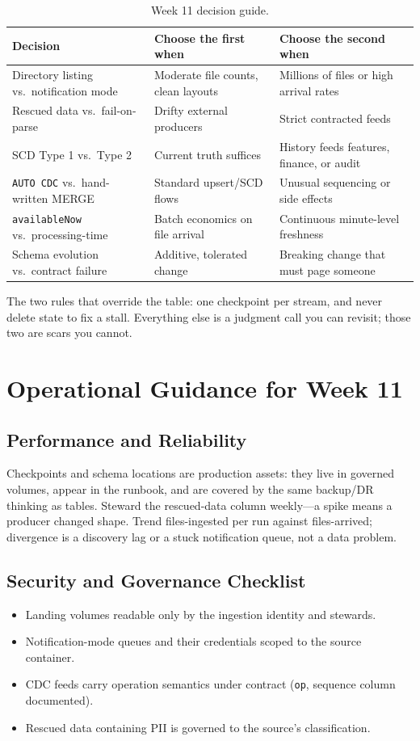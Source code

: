 \begin{table}[H]
\centering
\small
\begin{tabular}{@{}p{3.4cm}p{4.4cm}p{4.6cm}@{}}
\toprule
\textbf{Decision} & \textbf{Choose the first when} & \textbf{Choose the second when} \\
\midrule
Directory listing vs.\ notification mode & Moderate file counts, clean layouts & Millions of files or high arrival rates \\
Rescued data vs.\ fail-on-parse & Drifty external producers & Strict contracted feeds \\
SCD Type 1 vs.\ Type 2 & Current truth suffices & History feeds features, finance, or audit \\
\texttt{AUTO CDC} vs.\ hand-written MERGE & Standard upsert/SCD flows & Unusual sequencing or side effects \\
\texttt{availableNow} vs.\ processing-time & Batch economics on file arrival & Continuous minute-level freshness \\
Schema evolution vs.\ contract failure & Additive, tolerated change & Breaking change that must page someone \\
\bottomrule
\end{tabular}
\caption{Week 11 decision guide.}
\label{tab:ch11-decisions}
\end{table}

The two rules that override the table: one checkpoint per stream, and never delete state to fix a stall. Everything else is a judgment call you can revisit; those two are scars you cannot.

\section{Operational Guidance for Week 11}
%
\subsection{Performance and Reliability}
Checkpoints and schema locations are production assets: they live in governed volumes, appear in the runbook, and are covered by the same backup/DR thinking as tables. Steward the rescued-data column weekly---a spike means a producer changed shape. Trend files-ingested per run against files-arrived; divergence is a discovery lag or a stuck notification queue, not a data problem.

\subsection{Security and Governance Checklist}
\begin{itemize}
    \item Landing volumes readable only by the ingestion identity and stewards.
    \item Notification-mode queues and their credentials scoped to the source container.
    \item CDC feeds carry operation semantics under contract (\texttt{op}, sequence column documented).
    \item Rescued data containing PII is governed to the source's classification.
\end{itemize}

